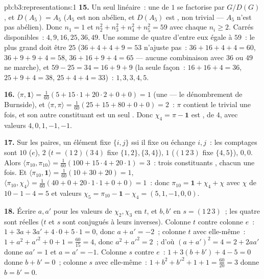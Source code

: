\begin{solution}{pb:b3:representations:1}
\textbf{15.} Un seul  linéaire~: une  de
 $1$ se factorise par $G/D(G)$, et $D(A_5) = A_5$ ($A_5$
est  non abélien, et $D(A_5)$ est , non trivial ---
$A_5$ n'est pas abélien). Donc $n_1 = 1$ et $n_2^2 + n_3^2 +
n_4^2 + n_5^2 = 59$ avec chaque $n_i \geq 2$. Carrés
disponibles~: $4, 9, 16, 25, 36, 49$. Une somme de quatre
d'entre eux égale à $59$~: le plus grand doit être $25$ ($36 +
4 + 4 + 9 = 53$ n'ajuste pas~: $36 + 16 + 4 + 4 = 60$, $36 + 9
+ 9 + 4 = 58$, $36 + 16 + 9 + 4 = 65$ --- aucune combinaison
avec $36$ ou $49$ ne marche), et $59 - 25 = 34 = 16 + 9 + 9$
(la seule façon~: $16 + 16 + 4 = 36$, $25 + 9 + 4 = 38$, $25 +
4 + 4 = 33$)~:  $1, 3, 3, 4, 5$.

\textbf{16.} $\langle\pi, \mathbf 1\rangle = \frac1{60}(5 +
15\cdot1 + 20\cdot2 + 0 + 0) = 1$ (une  --- le
dénombrement de Burnside), et $\langle\pi, \pi\rangle =
\frac1{60}(25 + 15 + 80 + 0 + 0) = 2$~: $\pi$ contient le
 trivial une fois, et son autre constituant est un
seul . Donc $\chi_4 = \pi - \mathbf 1$ est
, de  $4$, avec valeurs $4, 0, 1, -1, -1$.

\textbf{17.} Sur les paires, un élément fixe $\{i,j\}$ ssi il
fixe ou échange $i, j$~: les comptages sont $10$ ($e$), $2$
($t = (1\,2)(3\,4)$ fixe $\{1,2\}, \{3,4\}$), $1$ ($(1\,2\,3)$
fixe $\{4,5\}$), $0, 0$. Alors $\langle\pi_{10},
\pi_{10}\rangle = \frac1{60}(100 + 15\cdot4 + 20\cdot1) = 3$~:
trois constituants , chacun une fois. Et
$\langle\pi_{10}, \mathbf 1\rangle = \frac1{60}(10 + 30 + 20)
= 1$, $\langle\pi_{10}, \chi_4\rangle = \frac1{60}(40 + 0 +
20\cdot1\cdot1 + 0 + 0) = 1$~: donc $\pi_{10} = \mathbf 1 +
\chi_4 + \chi$ avec $\chi$  de  $10 - 1 - 4 =
5$ et valeurs $\chi_5 = \pi_{10} - \mathbf 1 - \chi_4 = (5, 1,
-1, 0, 0)$.

\textbf{18.} Écrire $a, a'$ pour les valeurs de $\chi_2,
\chi_3$ en $t$, et $b, b'$ en $s = (1\,2\,3)$~; les quatre sont
réelles ($t$ et $s$ sont conjugués à leurs inverses). Colonne
$t$ contre colonne $e$~: $1 + 3a + 3a' + 4\cdot0 + 5\cdot1 =
0$, donc $a + a' = -2$~; colonne $t$ avec elle-même~: $1 + a^2
+ a'^2 + 0 + 1 = \frac{60}{15} = 4$, donc $a^2 + a'^2 = 2$~;
d'où $(a + a')^2 = 4 = 2 + 2aa'$ donne $aa' = 1$ et $a = a' =
-1$. Colonne $s$ contre $e$~: $1 + 3(b + b') + 4 - 5 = 0$
donne $b + b' = 0$~; colonne $s$ avec elle-même~: $1 + b^2 +
b'^2 + 1 + 1 = \frac{60}{20} = 3$ donne $b = b' = 0$.


\end{solution}
